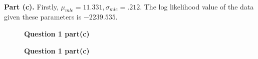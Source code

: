\documentclass[letterpaper,12pt]{article}
\theoremstyle{definition}
\begin{document}
\\
\noindent\textbf{Part (c).}
Firstly, $\mu_{mle}=11.331,\sigma_{mle}=.212$. The log likelihood value of the data
given these parameters is $-2239.535$.
\begin{figure}[htb]\centering\captionsetup{width=4.0in}
  \caption{\textbf{Question 1 part(c)}}\label{Figure 1c with 1a}
\end{figure}
\begin{figure}[htb]\centering\captionsetup{width=4.0in}
  \caption{\textbf{Question 1 part(c)}}\label{Figure 1c with b}
\end{figure}
\end{document}
